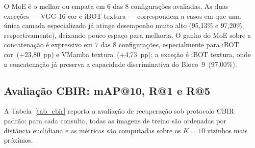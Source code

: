 \documentclass[conference]{IEEEtran}
\begin{document}
O MoE \'{e} o melhor ou empata em 6 das 8 configura\c{c}\~{o}es avaliadas.
As duas exce\c{c}\~{o}es --- VGG-16 cor e iBOT textura --- correspondem
a casos em que uma \'{u}nica camada especializada j\'{a} atinge desempenho
muito alto (95,13\% e 97,20\%, respectivamente), deixando pouco espa\c{c}o
para melhoria.
O ganho do MoE sobre a concatena\c{c}\~{a}o \'{e} expressivo em 7 das 8
configura\c{c}\~{o}es, especialmente para iBOT cor~($+$23,80~pp) e VMamba
textura~($+$4,73~pp); a exce\c{c}\~{a}o \'{e} iBOT textura, onde a
concatena\c{c}\~{a}o j\'{a} preserva a capacidade discriminativa do
Bloco~9~(97,00\%).

\subsection{Avalia\c{c}\~{a}o CBIR: mAP@10, R@1 e R@5}

A Tabela~\ref{tab_cbir} reporta a avalia\c{c}\~{a}o de recupera\c{c}\~{a}o
sob protocolo CBIR padr\~{a}o: para cada consulta, todas as imagens de
treino s\~{a}o ordenadas por dist\^{a}ncia euclidiana e as m\'{e}tricas
s\~{a}o computadas sobre os $K\!=\!10$ vizinhos mais pr\'{o}ximos.
\end{document}
